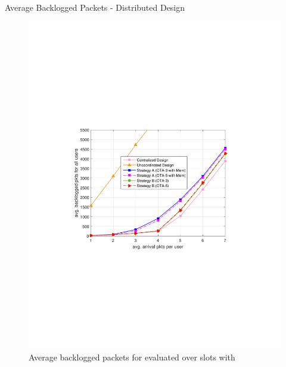 \documentclass[9pt]{beamer}
\begin{document}
\begin{frame}{Average Backlogged Packets - Distributed Design}
	\begin{figure}
		\centering
		\includegraphics[trim=5mm 90mm 5mm 90mm,clip, width=\columnwidth]{ICC-A-B1}
		\caption{Average backlogged packets for  evaluated over  slots with }
		\label{fig-2}
	\end{figure}
\end{frame}




%
\end{document}
